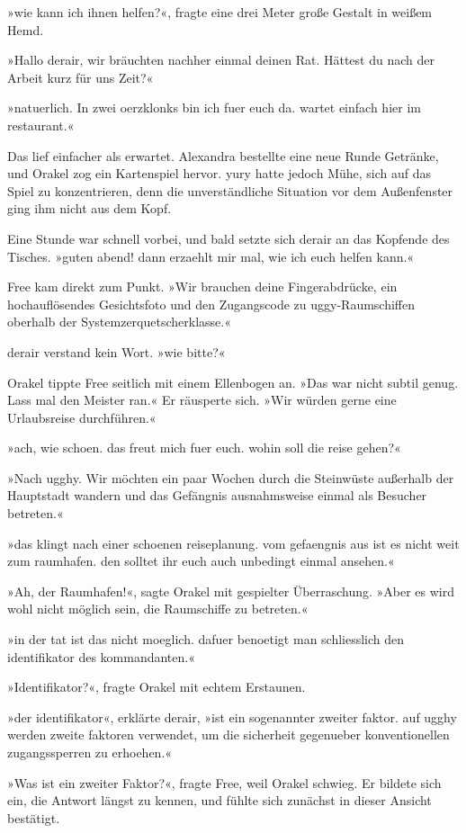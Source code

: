 »wie kann ich ihnen helfen?«, fragte eine drei Meter große Gestalt in weißem Hemd.

»Hallo derair, wir bräuchten nachher einmal deinen Rat. Hättest du nach der Arbeit kurz für uns Zeit?«

»natuerlich. In zwei oerzklonks bin ich fuer euch da. wartet einfach hier im restaurant.«

Das lief einfacher als erwartet. Alexandra bestellte eine neue Runde Getränke, und Orakel zog ein Kartenspiel hervor. yury hatte jedoch Mühe, sich auf das Spiel zu konzentrieren, denn die unverständliche Situation vor dem Außenfenster ging ihm nicht aus dem Kopf.

Eine Stunde war schnell vorbei, und bald setzte sich derair an das Kopfende des Tisches. »guten abend! dann erzaehlt mir mal, wie ich euch helfen kann.«

Free kam direkt zum Punkt. »Wir brauchen deine Fingerabdrücke, ein hochauflösendes Gesichtsfoto und den Zugangscode zu uggy-Raumschiffen oberhalb der Systemzerquetscherklasse.«

derair verstand kein Wort. »wie bitte?«

Orakel tippte Free seitlich mit einem Ellenbogen an. »Das war nicht subtil genug. Lass mal den Meister ran.« Er räusperte sich. »Wir würden gerne eine Urlaubsreise durchführen.«

»ach, wie schoen. das freut mich fuer euch. wohin soll die reise gehen?«

»Nach ugghy. Wir möchten ein paar Wochen durch die Steinwüste außerhalb der Hauptstadt wandern und das Gefängnis ausnahmsweise einmal als Besucher betreten.«

»das klingt nach einer schoenen reiseplanung. vom gefaengnis aus ist es nicht weit zum raumhafen. den solltet ihr euch auch unbedingt einmal ansehen.«

»Ah, der Raumhafen!«, sagte Orakel mit gespielter Überraschung. »Aber es wird wohl nicht möglich sein, die Raumschiffe zu betreten.«

»in der tat ist das nicht moeglich. dafuer benoetigt man schliesslich den identifikator des kommandanten.«

»Identifikator?«, fragte Orakel mit echtem Erstaunen.

»der identifikator«, erklärte derair, »ist ein sogenannter zweiter faktor. auf ugghy werden zweite faktoren verwendet, um die sicherheit gegenueber konventionellen zugangssperren zu erhoehen.«

»Was ist ein zweiter Faktor?«, fragte Free, weil Orakel schwieg. Er bildete sich ein, die Antwort längst zu kennen, und fühlte sich zunächst in dieser Ansicht bestätigt.

